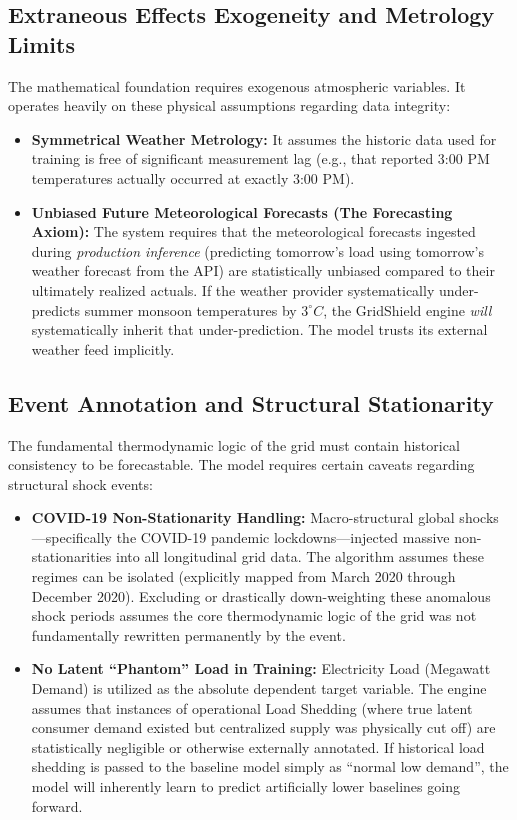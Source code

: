 \documentclass[11pt,a4paper]{article}
\begin{document}
\subsection{Extraneous Effects Exogeneity and Metrology Limits}
The mathematical foundation requires exogenous atmospheric variables. It operates heavily on these physical assumptions regarding data integrity:
\begin{itemize}
    \item \textbf{Symmetrical Weather Metrology:} It assumes the historic data used for training is free of significant measurement lag (e.g., that reported 3:00 PM temperatures actually occurred at exactly 3:00 PM).
    \item \textbf{Unbiased Future Meteorological Forecasts (The Forecasting Axiom):} The system requires that the meteorological forecasts ingested during \textit{production inference} (predicting tomorrow’s load using tomorrow’s weather forecast from the API) are statistically unbiased compared to their ultimately realized actuals. If the weather provider systematically under-predicts summer monsoon temperatures by $3^\circ C$, the GridShield engine \textit{will} systematically inherit that under-prediction. The model trusts its external weather feed implicitly.
\end{itemize}

\subsection{Event Annotation and Structural Stationarity}
The fundamental thermodynamic logic of the grid must contain historical consistency to be forecastable. The model requires certain caveats regarding structural shock events:
\begin{itemize}
    \item \textbf{COVID-19 Non-Stationarity Handling:} Macro-structural global shocks---specifically the COVID-19 pandemic lockdowns---injected massive non-stationarities into all longitudinal grid data. The algorithm assumes these regimes can be isolated (explicitly mapped from March 2020 through December 2020). Excluding or drastically down-weighting these anomalous shock periods assumes the core thermodynamic logic of the grid was not fundamentally rewritten permanently by the event.
    \item \textbf{No Latent ``Phantom'' Load in Training:} Electricity Load (Megawatt Demand) is utilized as the absolute dependent target variable. The engine assumes that instances of operational Load Shedding (where true latent consumer demand existed but centralized supply was physically cut off) are statistically negligible or otherwise externally annotated. If historical load shedding is passed to the baseline model simply as ``normal low demand'', the model will inherently learn to predict artificially lower baselines going forward.
\end{itemize}
\end{document}
